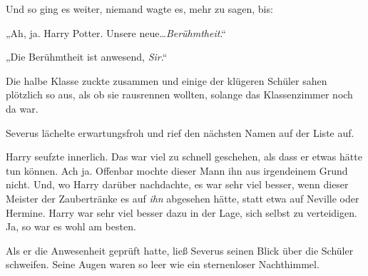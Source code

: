 Und so ging es weiter, niemand wagte es, mehr zu sagen, bis:

„Ah, ja. Harry Potter. Unsere neue…\emph{Berühmtheit}.“

„Die Berühmtheit ist anwesend, \emph{Sir}.“

Die halbe Klasse zuckte zusammen und einige der klügeren Schüler sahen plötzlich so aus, als ob sie rausrennen wollten, solange das Klassenzimmer noch da war.

Severus lächelte erwartungsfroh und rief den nächsten Namen auf der Liste auf.

Harry seufzte innerlich. Das war viel zu schnell geschehen, als dass er etwas hätte tun können. Ach ja. Offenbar mochte dieser Mann ihn aus irgendeinem Grund nicht. Und, wo Harry darüber nachdachte, es war sehr viel besser, wenn dieser Meister der Zaubertränke es auf \emph{ihn} abgesehen hätte, statt etwa auf Neville oder Hermine. Harry war sehr viel besser dazu in der Lage, sich selbst zu verteidigen. Ja, so war es wohl am besten.

Als er die Anwesenheit geprüft hatte, ließ Severus seinen Blick über die Schüler schweifen. Seine Augen waren so leer wie ein sternenloser Nachthimmel.


